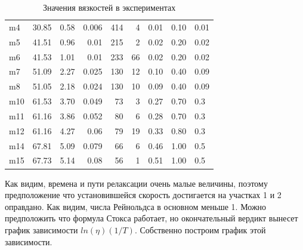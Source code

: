 \documentclass[a4paper, 12pt]{article}
\begin{document}
\begin{table}
\begin{center}
\begin{tabular}{|l|l|rr|rr|lll|}
            m4  & 30.85           & 0.58        & 0.006              & 414            & 4                    & 0.01 & 0.10         & 0.01       \\
            m5  & 41.51           & 0.96        & 0.01               & 215            & 2                    & 0.02 & 0.20         & 0.02        \\
            m6  & 41.53           & 1.01        & 0.01               & 233            & 66                   & 0.02 & 0.20         & 0.02        \\
            m7  & 51.09           & 2.27        & 0.025              & 130            & 12                   & 0.10 & 0.40         & 0.09        \\
            m8  & 51.05           & 2.18        & 0.024              & 130            & 10                   & 0.09 & 0.40         & 0.09        \\
            m10 & 61.53           & 3.70        & 0.049              & 73             & 3                    & 0.27 & 0.70         & 0.3         \\
            m11 & 61.16           & 3.86        & 0.052              & 80             & 6                    & 0.28 & 0.70         & 0.3         \\
            m12 & 61.16           & 4.27        & 0.06               & 79             & 19                   & 0.33 & 0.80         & 0.3         \\
            m14 & 67.81           & 5.09        & 0.079              & 66             & 6                    & 0.46 & 1.00         & 0.5         \\
            m15 & 67.73           & 5.14        & 0.08               & 56             & 1                    & 0.51 & 1.00         & 0.5         \\
            \hline
        \end{tabular}
    \end{center}

    \caption{Значения вязкостей в экспериментах}
    \label{data}
\end{table}

Как видим, времена и пути релаксации очень малые величины, поэтому предположение
что установившейся скорость достигается на участках 1 и 2 оправдано. Как видим,
числа Рейнольдса в основном меньше 1. Можно предположить что формула Стокса
работает, но окончательный вердикт вынесет график зависимости $ln(\eta)(1/T)$.
Собственно построим график этой зависимости.
\end{document}
